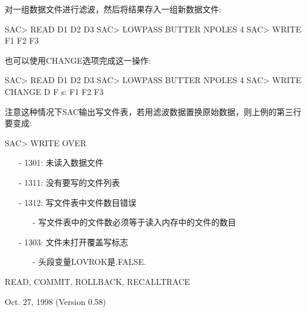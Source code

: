 对一组数据文件进行滤波，然后将结果存入一组新数据文件:
\begin{SACCode}
SAC> READ D1 D2 D3
SAC> LOWPASS BUTTER NPOLES 4
SAC> WRITE F1 F2 F3
\end{SACCode}

也可以使用CHANGE选项完成这一操作:
\begin{SACCode}
SAC> READ D1 D2 D3
SAC> LOWPASS BUTTER NPOLES 4
SAC> WRITE CHANGE D F
s:  F1 F2 F3
\end{SACCode}

注意这种情况下SAC输出写文件表，若用滤波数据置换原始数据，则上例的第三行要变成:
\begin{SACCode}
SAC> WRITE OVER
\end{SACCode}

\begin{itemize}
\item[-]1301: 未读入数据文件
\item[-]1311: 没有要写的文件列表
\item[-]1312: 写文件表中文件数目错误
	\begin{itemize}
	\item[-]写文件表中的文件数必须等于读入内存中的文件的数目
	\end{itemize}
\item[-]1303: 文件未打开覆盖写标志
	\begin{itemize}
	\item[-]头段变量LOVROK是.FALSE. 
	\end{itemize}
\end{itemize}

READ, COMMIT, ROLLBACK, RECALLTRACE

Oct. 27, 1998 (Version 0.58)
